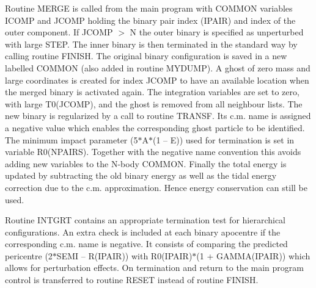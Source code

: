  Routine MERGE is called from the main program with COMMON variables ICOMP and JCOMP holding the                 
   binary pair index (IPAIR) and index of the outer component.                     
  If JCOMP $>$ N the outer binary is specified as unperturbed with
  large STEP. The inner binary is then terminated in the standard
  way by calling routine FINISH.
    The original binary configuration is saved in a new                     
   labelled COMMON (also added in routine MYDUMP).  A ghost of zero mass and large coordinates is                       
   created for index JCOMP to have an available location when the merged binary is activated again.  The                
   integration variables are set to zero, with large T0(JCOMP),
   and the ghost is removed from all neighbour lists.  The new                     
   binary is regularized by a call to routine TRANSF.  Its c.m. name is assigned a negative                  
   value which enables the corresponding ghost particle to be identified.  The minimum impact parameter                 
   (5$\ast$A$\ast$(1 -- E)) used for termination is set in variable R0(NPAIRS).  Together with the negative name                   
   convention this avoids adding new variables to the N-body COMMON.  Finally the total energy is                       
   updated by subtracting the old binary energy as well as the tidal energy correction due to the c.m.                  
  approximation.  Hence energy conservation can still be used.

 Routine INTGRT contains an appropriate termination test for hierarchical configurations.  An                    
   extra check is included at each binary apocentre if the corresponding c.m. name is negative.  It                     
   consists of comparing the predicted pericentre (2$\ast$SEMI -- R(IPAIR)) with R0(IPAIR)$\ast$(1 +                             
   GAMMA(IPAIR)) which allows for perturbation effects.  On termination and return to the main program                  
   control is transferred to routine RESET instead of routine FINISH.                                                   

